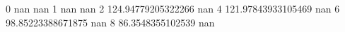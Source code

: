 0 nan nan
1 nan nan
2 124.94779205322266 nan
4 121.97843933105469 nan
6 98.85223388671875 nan
8 86.3548355102539 nan
